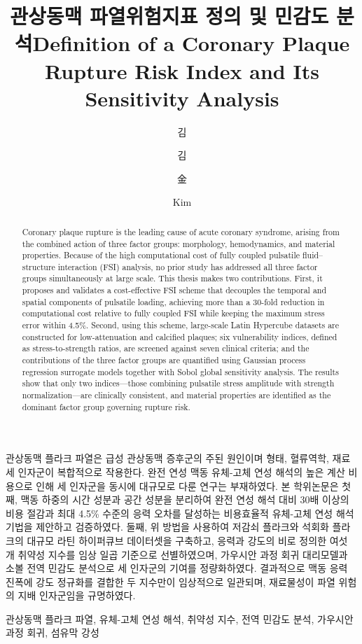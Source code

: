 \documentclass[master,english,final]{kaist-ucs}
\title[korean] {관상동맥 파열위험지표 정의 및 민감도 분석}
\title[english]{Definition of a Coronary Plaque Rupture Risk Index and Its Sensitivity Analysis}
\author[korean]{김}{세 혁}
\author[korean2]{김}{세혁}
\author[chinese]{金}{世 赫}
\author[english]{Kim}{Sehyeog}
\begin{document}
\thesisinfo

\begin{summary}
관상동맥 플라크 파열은 급성 관상동맥 증후군의 주된 원인이며 형태, 혈류역학, 재료 세 인자군이 복합적으로 작용한다.
완전 연성 맥동 유체-고체 연성 해석의 높은 계산 비용으로 인해 세 인자군을 동시에 대규모로 다룬 연구는 부재하였다.
본 학위논문은 첫째, 맥동 하중의 시간 성분과 공간 성분을 분리하여 완전 연성 해석 대비 30배 이상의 비용 절감과 최대 4.5\% 수준의
응력 오차를 달성하는 비용효율적 유체-고체 연성 해석 기법을 제안하고 검증하였다.
둘째, 위 방법을 사용하여 저감쇠 플라크와 석회화 플라크의 대규모 라틴 하이퍼큐브 데이터셋을 구축하고,
응력과 강도의 비로 정의한 여섯 개 취약성 지수를 임상 일곱 기준으로 선별하였으며, 가우시안 과정 회귀 대리모델과 소볼 전역 민감도 분석으로 세 인자군의 기여를 정량화하였다.
결과적으로 맥동 응력 진폭에 강도 정규화를 결합한 두 지수만이 임상적으로 일관되며, 재료물성이 파열 위험의 지배 인자군임을 규명하였다.
\end{summary}

\begin{Korkeyword}
관상동맥 플라크 파열, 유체-고체 연성 해석, 취약성 지수, 전역 민감도 분석, 가우시안 과정 회귀, 섬유막 강성
\end{Korkeyword}

\begin{abstract}
Coronary plaque rupture is the leading cause of acute coronary syndrome, arising from the combined action of three factor groups: morphology, hemodynamics, and material properties. Because of the high computational cost of fully coupled pulsatile fluid--structure interaction (FSI) analysis, no prior study has addressed all three factor groups simultaneously at large scale. This thesis makes two contributions. First, it proposes and validates a cost-effective FSI scheme that decouples the temporal and spatial components of pulsatile loading, achieving more than a 30-fold reduction in computational cost relative to fully coupled FSI while keeping the maximum stress error within 4.5\%.
Second, using this scheme, large-scale Latin Hypercube datasets are constructed for low-attenuation and calcified plaques; six vulnerability indices, defined as stress-to-strength ratios, are screened against seven clinical criteria; and the contributions of the three factor groups are quantified using Gaussian process regression surrogate models together with Sobol global sensitivity analysis. The results show that only two indices---those combining pulsatile stress amplitude with strength normalization---are clinically consistent, and material properties are identified as the dominant factor group governing rupture risk.
\end{abstract}
\end{document}
